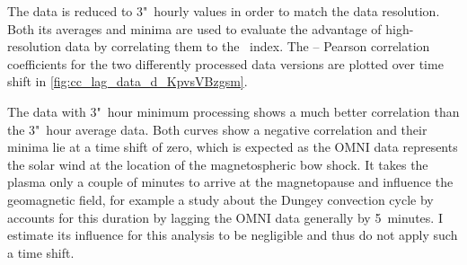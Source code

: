 The data is reduced to 3"~hourly values in order to match the \Kp{} data resolution. Both its averages and minima are used to evaluate the advantage of high-resolution data by correlating them to the \Kp~index. The \Kp{}--\vBz{} Pearson correlation coefficients for the two differently processed data versions are plotted over time shift in \autoref{fig:cc_lag_data_d_KpvsVBzgsm}.
\begin{figure}[htb]
	\begin{floatrow}
	\end{floatrow}
\end{figure}
\pagebreak
The data with 3"~hour minimum processing shows a much better correlation than the 3"~hour average data. Both curves show a negative correlation and their minima lie at a time shift of zero, which is expected as the OMNI data represents the solar wind at the location of the magnetospheric bow shock. It takes the plasma only a couple of minutes to arrive at the magnetopause and influence the geomagnetic field, for example a study about the Dungey convection cycle by \citet{Zhang2015} accounts for this duration by lagging the OMNI data generally by 5~minutes. I estimate its influence for this analysis to be negligible and thus do not apply such a time shift.

